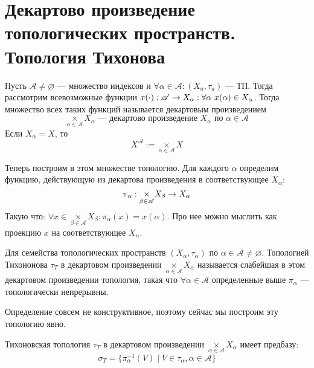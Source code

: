 \newpage
\section{Декартово произведение топологических пространств. Топология Тихонова}
\begin{definition}
	Пусть $\mathscr{A} \neq \varnothing$ --- множество индексов и $\forall \alpha \in \mathscr{A}: (X_a, \tau_a)$ --- ТП. Тогда рассмотрим всевозможные функции $x(\cdot): \mathscr{A} \rightarrow X_\alpha: \forall \alpha \ x(\alpha) \in X_\alpha$. Тогда множество всех таких функций называется декартовым произведением 
	$$
	\underset{\alpha \in \mathscr{A}}{\times}  X_\alpha \text{ --- декартово произведение $X_\alpha$ по $\alpha \in \mathscr{A}$}
	$$
	Если $X_\alpha = X$, то
	$$
	X^\mathscr{A} := \underset{\alpha \in \mathscr{A}}{\times}  X
	$$
\end{definition}
Теперь построим в этом множестве топологию. Для каждого $\alpha$ определим функцию, действующую из декартова произведения в соответствующее $X_\alpha$: 
$$\pi_\alpha : \underset{\beta \in \mathscr{A}}{\times}  X_\beta \rightarrow X_\alpha$$ 
Такую что:
$\forall x \in \underset{\beta \in \mathscr{A}}{\times}  X_\beta: \pi_\alpha(x) = x(\alpha)$. Про нее можно мыслить как проекцию $x$ на соответствующее $X_\alpha$.
\begin{definition}
	Для семейства топологических пространств $(X_\alpha, \tau_\alpha)$ по $\alpha \in \mathscr{A} \neq \varnothing$. Топологией Тихононова $\tau_T$ в декартовом произведении $\underset{\alpha \in \mathscr{A}}{\times}  X_\alpha$ называется слабейшая в этом декартовом произведении топология, такая что $\forall \alpha \in \mathscr{A}$ определенные выше $\pi_\alpha$ --- топологически непрерывны. 
\end{definition}
Определение совсем не конструктивное, поэтому сейчас мы построим эту топологию явно.
\begin{claim}
	Тихоновская топология $\tau_T$ в декартовом произведении $\underset{\alpha \in \mathscr{A}}{\times} X_\alpha$ имеет предбазу:
	$$
	\sigma_T = \{\pi_\alpha^{-1}(V) \mid V \in \tau_\alpha, \alpha \in \mathscr{A}\}
	$$
\end{claim}
